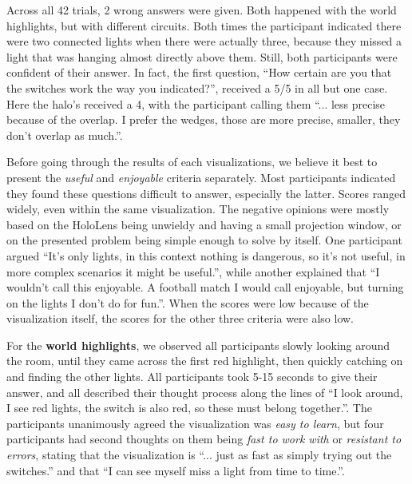 Across all 42 trials, 2 wrong answers were given. Both happened with the world highlights, but with different circuits. Both times the participant indicated there were two connected lights when there were actually three, because they missed a light that was hanging almost directly above them. Still, both participants were confident of their answer. In fact, the first question, ``How certain are you that the switches work the way you indicated?'', received a 5/5 in all but one case. Here the halo's received a 4, with the participant calling them ``... less precise because of the overlap. I prefer the wedges, those are more precise, smaller, they don't overlap as much.''.

Before going through the results of each visualizations, we believe it best to present the \textit{useful} and \textit{enjoyable} criteria separately. Most participants indicated they found these questions difficult to answer, especially the latter. Scores ranged widely, even within the same visualization. The negative opinions were mostly based on the HoloLens being unwieldy and having a small projection window, or on the presented problem being simple enough to solve by itself. One participant argued ``It's only lights, in this context nothing is dangerous, so it's not useful, in more complex scenarios it might be useful.'', while another explained that ``I wouldn't call this enjoyable. A football match I would call enjoyable, but turning on the lights I don't do for fun.''. When the scores were low because of the visualization itself, the scores for the other three criteria were also low.

For the \textbf{world highlights}, we observed all participants slowly looking around the room, until they came across the first red highlight, then quickly catching on and finding the other lights. All participants took 5-15 seconds to give their answer, and all described their thought process along the lines of ``I look around, I see red lights, the switch is also red, so these must belong together.''. The participants unanimously agreed the visualization was \textit{easy to learn}, but four participants had second thoughts on them being \textit{fast to work with} or \textit{resistant to errors}, stating that the visualization is ``... just as fast as simply trying out the switches.'' and that ``I can see myself miss a light from time to time.''.

